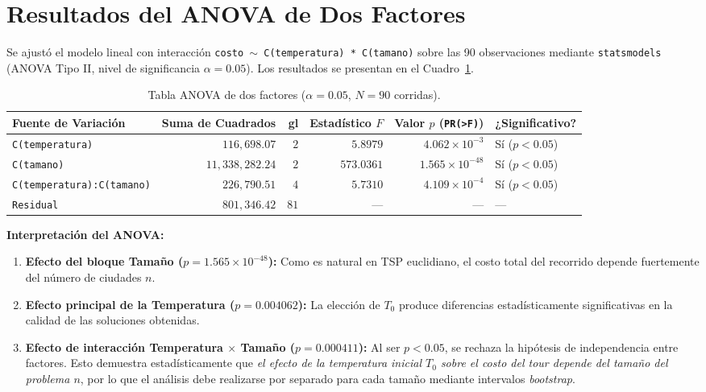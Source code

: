\documentclass[11pt,letterpaper]{article}
\begin{document}
\section{\color{rojouanl} Resultados del ANOVA de Dos Factores}

Se ajustó el modelo lineal con interacción \texttt{costo $\sim$ C(temperatura) * C(tamano)} sobre las 90 observaciones mediante \texttt{statsmodels} (ANOVA Tipo II, nivel de significancia $\alpha = 0.05$). Los resultados se presentan en el Cuadro~\ref{tab:anova}.

\begin{table}[H]
\centering
\caption{Tabla ANOVA de dos factores ($\alpha = 0.05$, $N = 90$ corridas).}
\label{tab:anova}
\begin{tabular}{@{}lrrrrl@{}}
\toprule
\textbf{Fuente de Variación} & \textbf{Suma de Cuadrados} & \textbf{gl} & \textbf{Estadístico $F$} & \textbf{Valor $p$ (\texttt{PR(>F)})} & \textbf{¿Significativo?} \\
\midrule
\texttt{C(temperatura)}             & $116{,}698.07$     & $2$  & $5.8979$   & $4.062 \times 10^{-3}$  & Sí ($p < 0.05$) \\
\texttt{C(tamano)}                  & $11{,}338{,}282.24$ & $2$  & $573.0361$ & $1.565 \times 10^{-48}$ & Sí ($p < 0.05$) \\
\texttt{C(temperatura):C(tamano)}   & $226{,}790.51$     & $4$  & $5.7310$   & $4.109 \times 10^{-4}$  & Sí ($p < 0.05$) \\
\texttt{Residual}                   & $801{,}346.42$     & $81$ & ---        & ---                     & --- \\
\bottomrule
\end{tabular}
\end{table}

\textbf{Interpretación del ANOVA:}
\begin{enumerate}
    \item \textbf{Efecto del bloque Tamaño ($p = 1.565 \times 10^{-48}$):} Como es natural en TSP euclidiano, el costo total del recorrido depende fuertemente del número de ciudades $n$.
    \item \textbf{Efecto principal de la Temperatura ($p = 0.004062$):} La elección de $T_0$ produce diferencias estadísticamente significativas en la calidad de las soluciones obtenidas.
    \item \textbf{Efecto de interacción Temperatura $\times$ Tamaño ($p = 0.000411$):} Al ser $p < 0.05$, se rechaza la hipótesis de independencia entre factores. Esto demuestra estadísticamente que \emph{el efecto de la temperatura inicial $T_0$ sobre el costo del tour depende del tamaño del problema $n$}, por lo que el análisis debe realizarse por separado para cada tamaño mediante intervalos \textit{bootstrap}.
\end{enumerate}
\end{document}
